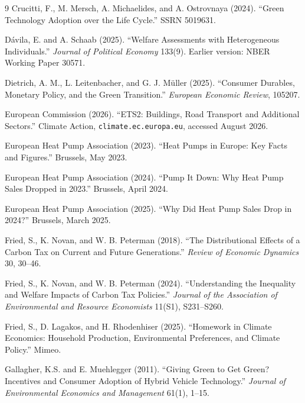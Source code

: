 \begin{thebibliography}{9}
Crucitti, F., M. Mersch, A. Michaelides, and A. Ostrovnaya (2024).
``Green Technology Adoption over the Life Cycle.'' SSRN 5019631.

D\'avila, E. and A. Schaab (2025).
``Welfare Assessments with Heterogeneous Individuals.''
\emph{Journal of Political Economy} 133(9). Earlier version: NBER Working Paper 30571.

Dietrich, A. M., L. Leitenbacher, and G. J. M\"uller (2025).
``Consumer Durables, Monetary Policy, and the Green Transition.''
\emph{European Economic Review}, 105207.

European Commission (2026).
``ETS2: Buildings, Road Transport and Additional Sectors.''
Climate Action, \texttt{climate.ec.europa.eu}, accessed August 2026.

European Heat Pump Association (2023).
``Heat Pumps in Europe: Key Facts and Figures.'' Brussels, May 2023.

European Heat Pump Association (2024).
``Pump It Down: Why Heat Pump Sales Dropped in 2023.'' Brussels, April 2024.

European Heat Pump Association (2025).
``Why Did Heat Pump Sales Drop in 2024?'' Brussels, March 2025.

Fried, S., K. Novan, and W. B. Peterman (2018).
``The Distributional Effects of a Carbon Tax on Current and Future Generations.''
\emph{Review of Economic Dynamics} 30, 30--46.

Fried, S., K. Novan, and W. B. Peterman (2024).
``Understanding the Inequality and Welfare Impacts of Carbon Tax Policies.''
\emph{Journal of the Association of Environmental and Resource Economists} 11(S1), S231--S260.

Fried, S., D. Lagakos, and H. Rhodenhiser (2025).
``Homework in Climate Economics: Household Production, Environmental Preferences,
and Climate Policy.'' Mimeo.

Gallagher, K.S. and E. Muehlegger (2011).
``Giving Green to Get Green? Incentives and Consumer Adoption of Hybrid Vehicle Technology.''
\emph{Journal of Environmental Economics and Management} 61(1), 1--15.


\end{thebibliography}
